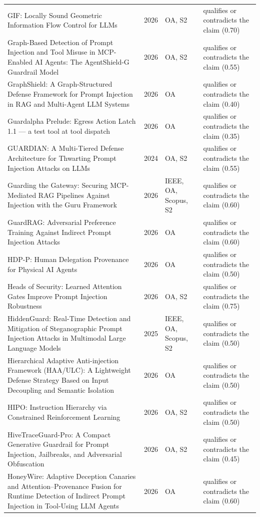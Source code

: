 \begin{longtable}{@{}%
  >{\raggedright\arraybackslash}p{}c%
  >{\raggedright\arraybackslash}p{}%
  >{\raggedright\arraybackslash}p{}@{}}
GIF: Locally Sound Geometric Information Flow Control for LLMs & 2026 & OA, S2 & qualifies or contradicts the claim (0.70) \\
Graph-Based Detection of Prompt Injection and Tool Misuse in MCP-Enabled AI Agents: The AgentShield-G Guardrail Model & 2026 & OA, S2 & qualifies or contradicts the claim (0.55) \\
GraphShield: A Graph-Structured Defense Framework for Prompt Injection in RAG and Multi-Agent LLM Systems & 2026 & OA & qualifies or contradicts the claim (0.40) \\
Guardalpha Prelude: Egress Action Latch 1.1 --- a test tool at tool dispatch & 2026 & OA & qualifies or contradicts the claim (0.35) \\
GUARDIAN: A Multi-Tiered Defense Architecture for Thwarting Prompt Injection Attacks on LLMs & 2024 & OA, S2 & qualifies or contradicts the claim (0.55) \\
Guarding the Gateway: Securing MCP-Mediated RAG Pipelines Against Injection with the Guru Framework & 2026 & IEEE, OA, Scopus, S2 & qualifies or contradicts the claim (0.60) \\
GuardRAG: Adversarial Preference Training Against Indirect Prompt Injection Attacks & 2026 & OA & qualifies or contradicts the claim (0.60) \\
HDP-P: Human Delegation Provenance for Physical AI Agents & 2026 & OA & qualifies or contradicts the claim (0.50) \\
Heads of Security: Learned Attention Gates Improve Prompt Injection Robustness & 2026 & OA, S2 & qualifies or contradicts the claim (0.75) \\
HiddenGuard: Real-Time Detection and Mitigation of Steganographic Prompt Injection Attacks in Multimodal Large Language Models & 2025 & IEEE, OA, Scopus, S2 & qualifies or contradicts the claim (0.50) \\
Hierarchical Adaptive Anti-injection Framework (HAA/ULC): A Lightweight Defense Strategy Based on Input Decoupling and Semantic Isolation & 2026 & OA & qualifies or contradicts the claim (0.50) \\
HIPO: Instruction Hierarchy via Constrained Reinforcement Learning & 2026 & OA, S2 & qualifies or contradicts the claim (0.50) \\
HiveTraceGuard-Pro: A Compact Generative Guardrail for Prompt Injection, Jailbreaks, and Adversarial Obfuscation & 2026 & OA, S2 & qualifies or contradicts the claim (0.45) \\
HoneyWire: Adaptive Deception Canaries and Attention--Provenance Fusion for Runtime Detection of Indirect Prompt Injection in Tool-Using LLM Agents & 2026 & OA & qualifies or contradicts the claim (0.60) \\

\end{longtable}
